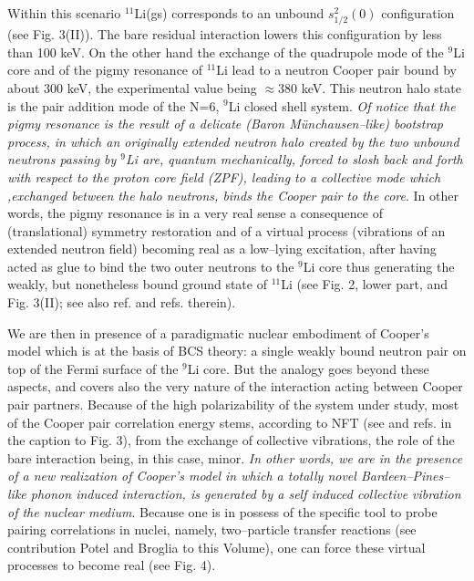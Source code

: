 \documentclass[a4paper,14pt]{book}
\begin{document}
Within this scenario ${}^{11}$Li(gs) corresponds to an unbound $s_{1/2}^2 (0)$ configuration (see Fig. 3(II)). The bare residual interaction lowers this configuration by less than 100 keV. On the other hand the exchange of the quadrupole mode of the ${}^9$Li core and of the pigmy resonance of ${}^{11}$Li lead to a neutron Cooper pair bound by about 300 keV, the experimental value being $\approx 380$ keV. This neutron halo state is the pair addition mode of the N=6, $^{9}$Li closed shell system. \textit{Of notice that the pigmy resonance is the result of a delicate (Baron M\"unchausen--like) bootstrap process, in which an originally extended neutron halo created by the two unbound neutrons passing by ${}^9$Li are, quantum mechanically, forced to slosh back and forth with respect to the proton core field (ZPF), leading to a collective mode which ,exchanged between the halo neutrons, binds the Cooper pair to the core}. In other words, the pigmy resonance is in a very real sense a consequence of (translational) symmetry restoration and of a virtual process (vibrations of an extended neutron field) becoming real as a low--lying excitation, after having acted as glue to bind the two outer neutrons to the ${}^{9}$Li core thus generating the weakly, but nonetheless bound ground state of ${}^{11}$Li (see Fig. 2, lower part, and Fig. 3(II); see also ref.\cite{epj_li11,Brink:10} and refs. therein).

We are then in presence of a paradigmatic nuclear embodiment of Cooper's model\cite{Cooper:56} which is at the basis of BCS theory: a single weakly bound neutron pair on top of the Fermi surface of the ${}^9$Li core. But the analogy goes beyond these aspects, and covers also the very nature of the interaction acting between Cooper pair partners. Because of the high polarizability of the system under study, most of the Cooper pair correlation energy stems, according to NFT (see \cite{epj_li11} and refs. in the caption to Fig. 3), from the exchange of collective vibrations, the role of the bare interaction being, in this case, minor. \textit{In other words, we are in the presence of a new realization of Cooper's model in which a totally novel Bardeen--Pines--like phonon induced interaction\cite{Bardeen:55}, is generated by a self induced collective vibration of the nuclear medium}. Because one is in possess of the specific tool to probe pairing correlations in nuclei, namely, two--particle transfer reactions (see contribution Potel and Broglia to this Volume), one can force these virtual processes to become real (see Fig. 4).
\end{document}

